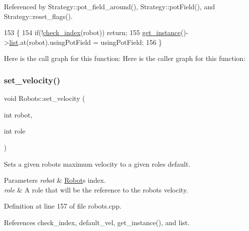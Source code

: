 Referenced by Strategy\+::pot\+\_\+field\+\_\+around(), Strategy\+::pot\+Field(), and Strategy\+::reset\+\_\+flags().


\begin{DoxyCode}
153                                                             \{
154     \textcolor{keywordflow}{if}(!\hyperlink{robots_8hpp_ae3e6ae8f87cdc750c0b99bc609d9ae43}{check\_index}(robot)) \textcolor{keywordflow}{return};
155     \hyperlink{class_robots_a589bce74db5f34af384952d48435168f}{get\_instance}()->\hyperlink{class_robots_a2c6b77265028f82a4342ca1ef15ed305}{list}.at(robot).usingPotField = usingPotField;
156 \}
\end{DoxyCode}
Here is the call graph for this function\+:
Here is the caller graph for this function\+:
\mbox{\label{class_robots_ae37da9b7ca9d84bee564c328db139758}} 
\subsubsection{\texorpdfstring{set\+\_\+velocity()}{set\_velocity()}\hspace{0.1cm}{\footnotesize\ttfamily [1/3]}}
{\footnotesize\ttfamily void Robots\+::set\+\_\+velocity (\begin{DoxyParamCaption}\item[{int}]{robot,  }\item[{int}]{role }\end{DoxyParamCaption})\hspace{0.3cm}{\ttfamily [static]}}

Sets a given robot\textquotesingle{}s maximum velocity to a given role\textquotesingle{}s default. 
\begin{DoxyParams}{Parameters}
{\em robot} & \hyperlink{struct_robots_1_1_robot}{Robot}\textquotesingle{}s index. \\
\hline
{\em role} & A role that will be the reference to the robot\textquotesingle{}s velocity. \\
\hline
\end{DoxyParams}


Definition at line 157 of file robots.\+cpp.



References check\+\_\+index, default\+\_\+vel, get\+\_\+instance(), and list.



